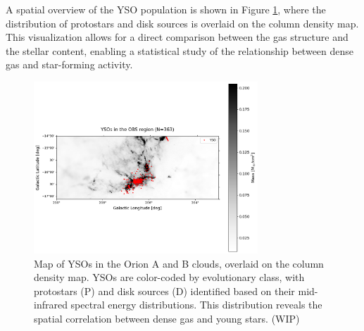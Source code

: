 A spatial overview of the YSO population is shown in Figure \ref{fig:YSO_map}, where the distribution of protostars and disk sources is overlaid on the column density map. This visualization allows for a direct comparison between the gas structure and the stellar content, enabling a statistical study of the relationship between dense gas and star-forming activity.

\begin{figure}[t]
    \centering
    \includegraphics[width=0.75\textwidth]{figures/YSOs_orion.png}
    \caption{Map of YSOs in the Orion A and B clouds, overlaid on the column density map. YSOs are color-coded by evolutionary class, with protostars (P) and disk sources (D) identified based on their mid-infrared spectral energy distributions. This distribution reveals the spatial correlation between dense gas and young stars. (WIP)}
    \label{fig:YSO_map}
\end{figure}

